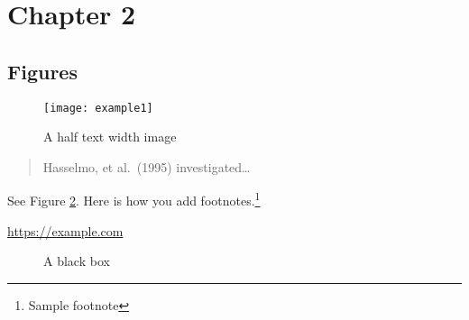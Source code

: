 \section{Chapter 2}

\subsection{Figures}

\lipsum[10]

\begin{figure}[h]
    \centering
    \texttt{[image: example1]}
    \caption{A half text width image}
    \label{fig:halfwidthimage}
\end{figure}

\begin{quote}
  Hasselmo, et al.\ (1995) investigated\dots
\end{quote}

See Figure \ref{fig:blackbox}. Here is how you add footnotes.\footnote{Sample footnote}

\lipsum[2]

\begin{center}
  \url{https://example.com}
\end{center}

\begin{figure}[h]
  \centering
  \fbox{\rule[-0.5cm]{4cm}{4cm} \rule[-0.5cm]{4cm}{0cm}}
  \caption{A black box}
  \label{fig:blackbox}
\end{figure}

\lipsum[9]
